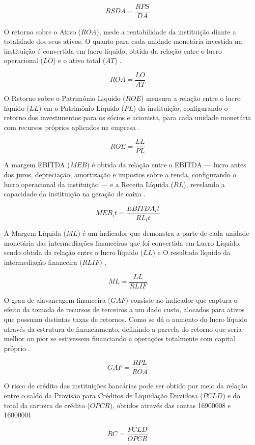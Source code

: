 \documentclass[12pt,12pt,openright,oneside,a4paper,chapter=TITLE,section=TITLE,subsection=TITLE,subsubsection=TITLE english,french,spanish,portugues,sumario=tradicional]{abntex2}
\begin{document}
\[
RSDA = \frac{RPS_{}}{DA_{}}
\]

O retorno sobre o Ativo (\(ROA\)), mede a rentabilidade da instituição diante a totalidade dos seus ativos. O quanto para cada unidade monetária investida na instituição é convertida em lucro líquido, obtida da relação entre o lucro operacional (\(LO\)) e o ativo total (\(AT\)) \cite{assaf:2020}.

\[
ROA = \frac{LO}{AT}
\]

O Retorno sobre o Patrimônio Liquido (\(ROE\)) mensura a relação entre o lucro líquido (\(LL\)) em o Patrimônio Líquido (\(PL\)) da instituição, configurando o retorno dos investimentos para os sócios e acionista, para cada unidade monetária com recursos próprios aplicados na empresa \cite{assaf:2020}.

\[
ROE = \frac{LL}{PL}
\]

A margem EBITDA (\(MEB\)) é obtida da relação entre o EBITDA --- lucro antes dos juros, depreciação, amortização e impostos sobre a renda, configurando o lucro operacional da instituição --- e a Receita Líquida (\(RL\)), revelando a capacidade da instituição na geração de caixa \cite{assaf:2020}.

\[
MEB_it = \frac{EBITDA_it}{RL_it}
\]

A Margem Líquida (\(ML\)) é um indicador que demonstra a parte de cada unidade monetária das intermediações financeiras que foi convertida em Lucro Líquido, sendo obtida da relação entre o lucro líquido (\(LL\)) e O resultado líquido da intermediação financeira (\(RLIF\)) \cite{assaf:2020}.

\[
ML = \frac{LL}{RLIF}
\]

O grau de alavancagem financeira (\(GAF\)) consiste no indicador que captura o efeito da tomada de recursos de terceiros a um dado custo, alocados para ativos que possuam distintas taxas de retornos. Como se dá o aumento do lucro líquido através da estrutura de financiamento, definindo a parcela do retorno que seria melhor ou pior se estivessem financiando a operações totalmente com capital próprio \cite{assaf:2020}.

\[
GAF = \frac{RPL}{ROA}
\]

O risco de crédito das instituições bancárias pode ser obtido por meio da relação entre o saldo da Provisão para Créditos de Liquidação Duvidosa (\(PCLD\)) e do total da carteira de crédito (\(OPCR\)), obtidos através das contas 16900008 e 16000001 \cite{dantas:2012}

\[
RC_{} = \frac{PCLD_{}}{OPCR_{}}
\]
\end{document}
